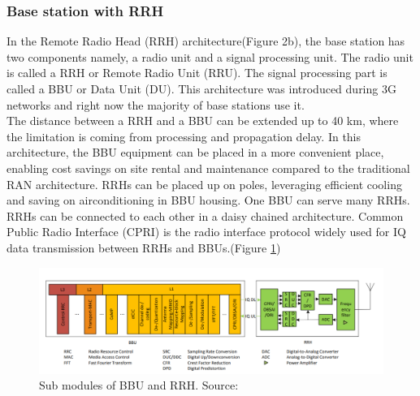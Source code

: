 \documentclass{article}
\begin{document}
\subsubsection{Base station with RRH}


In the Remote Radio Head (RRH) architecture(Figure 2b), the base station 
has two components namely, a radio unit and a signal processing 
unit. The radio unit is called a RRH or Remote Radio Unit (RRU).
The signal processing part is called a BBU or Data Unit (DU). 
This architecture was introduced during 3G networks and right now 
the majority of base stations use it.\\


The distance between a RRH and a BBU can be extended up to 40 km,
where the limitation is coming from processing and propagation delay.
In this architecture, the BBU equipment can be placed in a more 
convenient place, enabling cost savings on site rental and 
maintenance compared to the traditional RAN architecture. 
RRHs can be placed up on poles, leveraging efficient cooling and
saving on airconditioning in BBU housing. One BBU can serve many
RRHs. RRHs can be connected to each other in a daisy chained 
architecture. Common Public Radio Interface (CPRI) is the 
radio interface protocol widely used for IQ data transmission
between RRHs and BBUs.(Figure \ref{fig:RRH_BBU_CRAN})\nocite{checko14}



\begin{figure}[!h]
  \includegraphics[width=\linewidth]{res/RRH_BBU_CRAN.PNG}
    \caption{Sub modules of BBU and RRH. Source: \parencite{checko14}}
  \label{fig:RRH_BBU_CRAN}
\end{figure}
\end{document}
